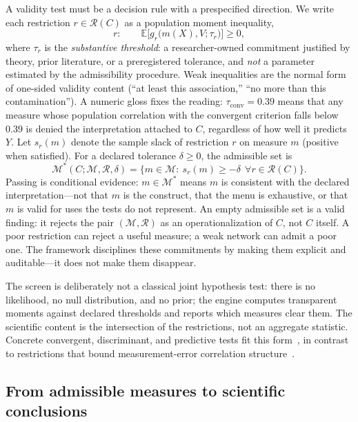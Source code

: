 \documentclass[10pt,letterpaper]{article}
\newcommand{\M}{\ensuremath{\mathcal{M}}}
\newcommand{\E}{\mathbb{E}}
\newcommand{\Rset}{\mathcal{R}}
\begin{document}
A validity test must be a decision rule with a prespecified direction.
We write each restriction $r\in\Rset(C)$ as a population moment inequality,
\begin{equation}
r:\qquad \E\bigl[g_r\bigl(m(X),V;\tau_r\bigr)\bigr]\ge 0,
\label{eq:restriction}
\end{equation}
where $\tau_r$ is the \emph{substantive threshold}: a researcher-owned commitment justified by theory, prior literature, or a preregistered tolerance, and \emph{not} a parameter estimated by the admissibility procedure.
Weak inequalities are the normal form of one-sided validity content (``at least this association,'' ``no more than this contamination'').
A numeric gloss fixes the reading: $\tau_{\mathrm{conv}}=0.39$ means that any measure whose population correlation with the convergent criterion falls below $0.39$ is denied the interpretation attached to $C$, regardless of how well it predicts $Y$.
Let $s_r(m)$ denote the sample slack of restriction $r$ on measure $m$ (positive when satisfied).
For a declared tolerance $\delta\ge 0$, the admissible set is
\begin{equation}
\M^*(C;\M,\Rset,\delta)=\bigl\{m\in\M:\ s_r(m)\ge-\delta\ \ \forall r\in\Rset(C)\bigr\}.
\label{eq:Mstar}
\end{equation}
Passing is conditional evidence: $m\in\M^*$ means $m$ is consistent with the declared interpretation---not that $m$ is the construct, that the menu is exhaustive, or that $m$ is valid for uses the tests do not represent.
An empty admissible set is a valid finding: it rejects the pair $(\M,\Rset)$ as an operationalization of $C$, not $C$ itself.
A poor restriction can reject a useful measure; a weak network can admit a poor one.
The framework disciplines these commitments by making them explicit and auditable---it does not make them disappear.

The screen is deliberately not a classical joint hypothesis test: there is no likelihood, no null distribution, and no prior; the engine computes transparent moments against declared thresholds and reports which measures clear them.
The scientific content is the intersection of the restrictions, not an aggregate statistic.
Concrete convergent, discriminant, and predictive tests fit this form~\cite{proxy2026,halterman2026}, in contrast to restrictions that bound measurement-error correlation structure~\cite{chenrttamer2026}.

\subsection{From admissible measures to scientific conclusions}
\label{sec:propagate}
\end{document}
